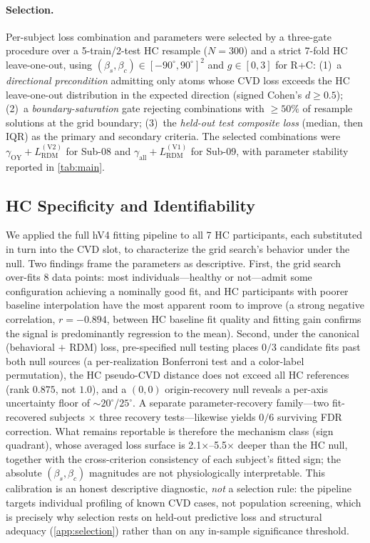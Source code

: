 \documentclass{article}
\begin{document}
\paragraph{Selection.}
Per-subject loss combination and parameters were selected by a three-gate procedure over a 5-train/2-test HC resample ($N = 300$) and a strict 7-fold HC leave-one-out, using $(\beta_s, \beta_c) \in [-90^\circ, 90^\circ]^2$ and $g \in [0,3]$ for R+C: (1)~a \emph{directional precondition} admitting only atoms whose CVD loss exceeds the HC leave-one-out distribution in the expected direction (signed Cohen's $d \geq 0.5$); (2)~a \emph{boundary-saturation} gate rejecting combinations with $\geq 50\%$ of resample solutions at the grid boundary; (3)~the \emph{held-out test composite loss} (median, then IQR) as the primary and secondary criteria. The selected combinations were $\gamma_{\text{OY}} + L_{\text{RDM}}^{(\text{V2})}$ for Sub-08 and $\gamma_{\text{all}} + L_{\text{RDM}}^{(\text{V1})}$ for Sub-09, with parameter stability reported in \cref{tab:main}.

\subsection{HC Specificity and Identifiability}
\label{app:hc_specificity}

We applied the full hV4 fitting pipeline to all 7 HC participants, each substituted in turn into the CVD slot, to characterize the grid search's behavior under the null.
Two findings frame the parameters as descriptive.
First, the grid search over-fits 8 data points: most individuals---healthy or not---admit some configuration achieving a nominally good fit, and HC participants with poorer baseline interpolation have the most apparent room to improve (a strong negative correlation, $r = -0.894$, between HC baseline fit quality and fitting gain confirms the signal is predominantly regression to the mean).
Second, under the canonical (behavioral $+$ RDM) loss, pre-specified null testing places $0/3$ candidate fits past both null sources (a per-realization Bonferroni test and a color-label permutation), the HC pseudo-CVD distance does not exceed all HC references (rank $0.875$, not $1.0$), and a $(0,0)$ origin-recovery null reveals a per-axis uncertainty floor of ${\sim}20^\circ$/$25^\circ$. A separate parameter-recovery family---two fit-recovered subjects $\times$ three recovery tests---likewise yields $0/6$ surviving FDR correction.
What remains reportable is therefore the mechanism class (sign quadrant), whose averaged loss surface is 2.1$\times$--5.5$\times$ deeper than the HC null, together with the cross-criterion consistency of each subject's fitted sign; the absolute $(\beta_s, \beta_c)$ magnitudes are not physiologically interpretable.
This calibration is an honest descriptive diagnostic, \emph{not} a selection rule: the pipeline targets individual profiling of known CVD cases, not population screening, which is precisely why selection rests on held-out predictive loss and structural adequacy (\cref{app:selection}) rather than on any in-sample significance threshold.
\end{document}
